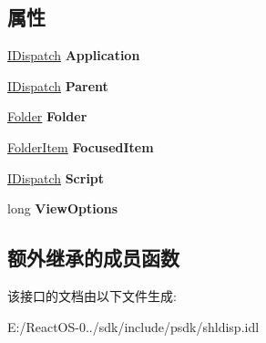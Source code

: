 \subsection*{属性}
\begin{DoxyCompactItemize}
\item 
\mbox{\label{interface_shell32_1_1_i_shell_folder_view_dual_a4c4eb1a36bcec7c9e43ab344753f34fc}} 
\hyperlink{interface_i_dispatch}{I\+Dispatch} {\bfseries Application}
\item 
\mbox{\label{interface_shell32_1_1_i_shell_folder_view_dual_a2b806baa3de1e8c1e0f1b8c4643094a9}} 
\hyperlink{interface_i_dispatch}{I\+Dispatch} {\bfseries Parent}
\item 
\mbox{\label{interface_shell32_1_1_i_shell_folder_view_dual_aec5b09ce2e1188914c7659178c03fd90}} 
\hyperlink{interface_shell32_1_1_folder}{Folder} {\bfseries Folder}
\item 
\mbox{\label{interface_shell32_1_1_i_shell_folder_view_dual_a734bc2c4376abe45d33c0b7b2a172759}} 
\hyperlink{interface_shell32_1_1_folder_item}{Folder\+Item} {\bfseries Focused\+Item}
\item 
\mbox{\label{interface_shell32_1_1_i_shell_folder_view_dual_a7e18f959ab387aac5345ad087885d7bf}} 
\hyperlink{interface_i_dispatch}{I\+Dispatch} {\bfseries Script}
\item 
\mbox{\label{interface_shell32_1_1_i_shell_folder_view_dual_a8237108e9f5f7f3df05a7d91e4de0a2a}} 
long {\bfseries View\+Options}
\end{DoxyCompactItemize}
\subsection*{额外继承的成员函数}


该接口的文档由以下文件生成\+:\begin{DoxyCompactItemize}
\item 
E\+:/\+React\+O\+S-\/0../sdk/include/psdk/shldisp.\+idl\end{DoxyCompactItemize}
